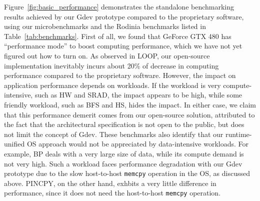Figure~\ref{fig:basic_performance} demonstrates the standalone
benchmarking results achieved by our Gdev prototype compared to the
proprietary software, using our microbenchmarks and the Rodinia
benchmarks listed in Table~\ref{tab:benchmarks}.
First of all, we found that GeForce GTX 480 has ``performance mode'' to
boost computing performance, which we have not yet figured out how to
turn on.
As observed in LOOP, our open-source implementation inevitably incurs
about 20\% of decrease in computing performance compared to the
proprietary software.
However, the impact on application performance depends on workloads.
If the workload is very compute-intensive, such as HW and SRAD, the
impact appears to be high, while some friendly workload, such as BFS and
HS, hides the impact.
In either case, we claim that this performance demerit comes from our
open-source solution, attributed to the fact that the architectural
specification is not open to the public, but does not limit the concept
of Gdev.
These benchmarks also identify that our runtime-unified OS approach
would not be appreciated by data-intensive workloads.
For example, BP deals with a very large size of data, while its compute
demand is not very high.
Such a workload faces performance degradation with our Gdev prototype
due to the slow host-to-host \texttt{memcpy} operation in the OS, as
discussed above.
PINCPY, on the other hand, exhbits a very little difference in
performance, since it does not need the host-to-host \texttt{memcpy}
operation.

